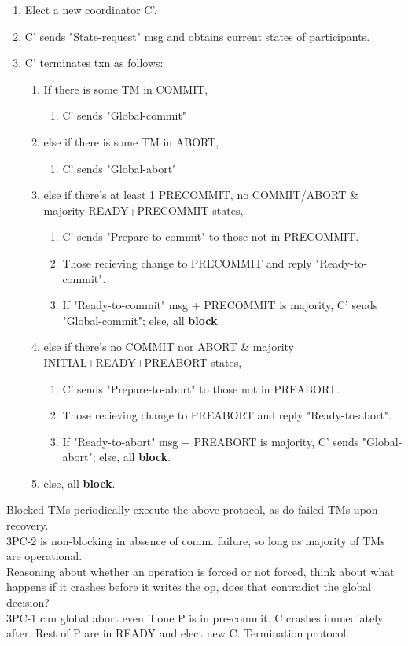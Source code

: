 \documentclass[8pt, landscape]{extarticle}
\begin{document}
\begin{multicols*}{4}
\begin{enumerate}
    \item Elect a new coordinator C'.
    \item C' sends "State-request" msg and obtains current states of participants.
    \item C' terminates txn as follows:
    \begin{enumerate}
        \item If there is some TM in COMMIT,
        \begin{enumerate}
            \item C' sends "Global-commit"
        \end{enumerate}
        \item else if there is some TM in ABORT,
        \begin{enumerate}
            \item C' sends "Global-abort"
        \end{enumerate}
        \item else if there's at least 1 PRECOMMIT, no COMMIT/ABORT \& majority READY+PRECOMMIT states,
        \begin{enumerate}
            \item C' sends "Prepare-to-commit" to those not in PRECOMMIT.
            \item Those recieving change to PRECOMMIT and reply "Ready-to-commit".
            \item If "Ready-to-commit" msg + PRECOMMIT is majority, C' sends "Global-commit"; else, all \textbf{block}.
        \end{enumerate}
        \item else if there's no COMMIT nor ABORT \& majority INITIAL+READY+PREABORT states,
        \begin{enumerate}
            \item C' sends "Prepare-to-abort" to those not in PREABORT.
            \item Those recieving change to PREABORT and reply "Ready-to-abort".
            \item If "Ready-to-abort" msg + PREABORT is majority, C' sends "Global-abort"; else, all \textbf{block}.
        \end{enumerate}
        \item else, all \textbf{block}.
    \end{enumerate}
\end{enumerate}

Blocked TMs periodically execute the above protocol, as do failed TMs upon recovery. \\
3PC-2 is non-blocking in absence of comm. failure, so long as majority of TMs are operational.\\
Reasoning about whether an operation is forced or not forced, think about what happens if it crashes before it writes the op, does that contradict the global decision?\\
3PC-1 can global abort even if one P is in pre-commit. C crashes immediately after. Rest of P are in READY and elect new C. Termination protocol.


\end{multicols*}
\end{document}

